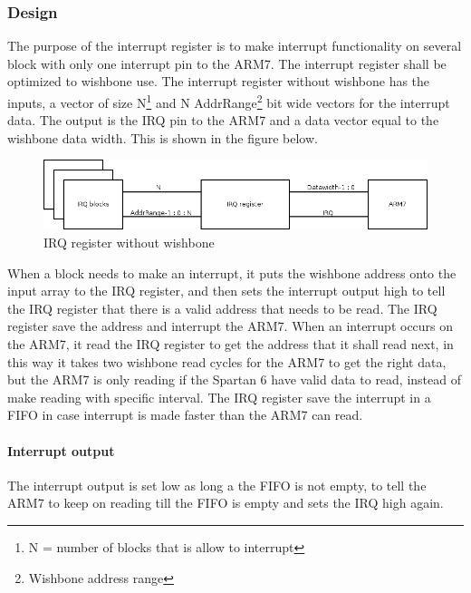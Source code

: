 \subsubsection{Design}
The purpose of the interrupt register is to make interrupt functionality on several block with only one interrupt pin to the ARM7. The interrupt register shall be optimized to wishbone use. The interrupt register without wishbone has the inputs, a vector of size N\footnote{N = number of blocks that is allow to interrupt} and N AddrRange\footnote{Wishbone address range} bit wide vectors for the interrupt data. The output is the IRQ pin to the ARM7 and a data vector equal to the wishbone data width. This is shown in the figure below.
\begin{figure}[H]
	\begin{centering}
		\includegraphics[width=1.0\textwidth]{images/tb5_irq_reg_nowb.png}
		\caption{IRQ register without wishbone}
	\end{centering}
\end{figure}
When a block needs to make an interrupt, it puts the wishbone address onto the input array to the IRQ register, and then sets the interrupt output high to tell the IRQ register that there is a valid address that needs to be read. The IRQ register save the address and interrupt the ARM7. When an interrupt occurs on the ARM7, it read the IRQ register to get the address that it shall read next, in this way it takes two wishbone read cycles for the ARM7 to get the right data, but the ARM7 is only reading if the Spartan 6 have valid data to read, instead of make reading with specific interval. The IRQ register save the interrupt in a FIFO in case interrupt is made faster than the ARM7 can read.\\
\paragraph{Interrupt output}
The interrupt output is set low as long a the FIFO is not empty, to tell the ARM7 to keep on reading till the FIFO is empty and sets the IRQ high again.
